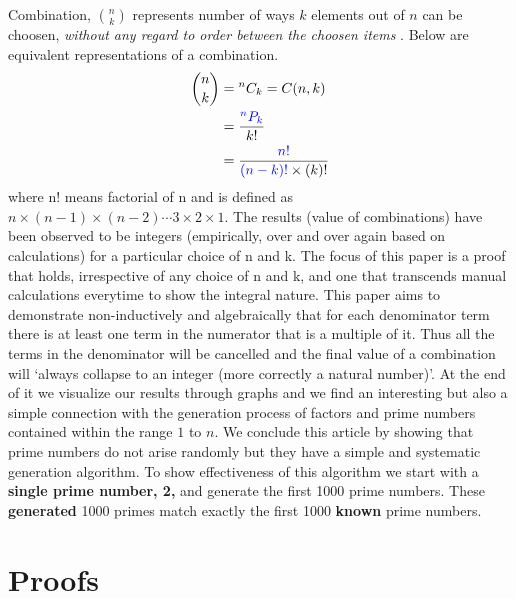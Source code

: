 \documentclass[10pt, twoside]{article}
\newcommand*{\Permutation}[2]{{}^{#1}P_{#2}}%
\newcommand*{\Combination}[2]{\binom{#1}{#2}}%
\begin{document}
	 	Combination, $\Combination{n}{k}$ represents number of ways $k$ elements out of $n$ can be choosen, \textit{without any regard to order between the choosen items} \cite{PrincTechCombinatorics}. Below are equivalent representations of a combination.
	\begin{align}
	\Combination{n}{k} &= {}^nC_k = C(n, k)  \\
					   &= \frac{\color{blue}\Permutation{n}{k}}{k!} \label{ConnectionBetweenPermutationAndCOmbination}\\	
					   &= \frac{\color{blue}n!}{{\color{blue}(n-k)!}\times(k)!} \label{FractionalDefinitionOfCombination}
	\end{align} 
	where n! means factorial of n and is defined as $n\times(n-1)\times(n-2)\cdots3\times2\times1$. 
		The results (value of combinations) have been observed to be integers (empirically, over and over again based on calculations) for a particular choice of n and k. The focus of this paper is a proof that holds, irrespective of any choice of n and k, and one that transcends manual calculations everytime to show the integral nature. This paper aims to demonstrate non-inductively and algebraically that for each denominator term there is at least one term in the numerator that is a multiple of it. Thus all the terms in the denominator will be cancelled and the final value of a combination will `always collapse to an integer (more correctly a natural number)'. At the end of it we visualize our results through graphs and we find an interesting but also a simple connection with the generation process of factors and prime numbers contained within the range $1$ to $n$. We conclude this article by showing that prime numbers do not arise randomly but they have a simple and systematic generation algorithm. To show effectiveness of this algorithm we start with a \textbf{single prime number, 2,} and generate the first 1000 prime numbers. These \textbf{generated} 1000 primes match exactly the first 1000 \textbf{known} prime numbers.
	\section{Proofs}
\end{document}
